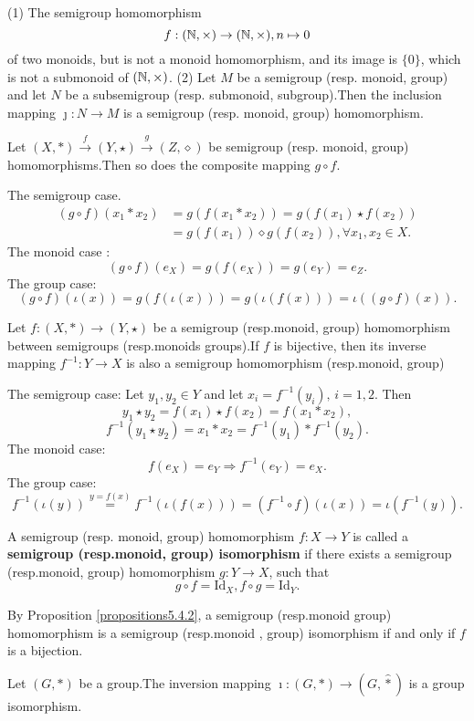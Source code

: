 \documentclass{book}
\numberwithin{equation}{section}
\begin{document}
\begin{remark}
    \quad
    \newline
    (1) The semigroup homomorphism
    $$f:(\mathbb{N}, \times)\rightarrow (\mathbb{N}, \times), n\mapsto 0$$
    of two monoids, but is not a monoid homomorphism, and its image is $\{0\}$,  which is not a submonoid of $(\mathbb{N}, \times)$.
    \newline
    (2) Let $M$ be a semigroup (resp. monoid, group) and let $N$ be a subsemigroup (resp. submonoid, subgroup).Then the inclusion mapping $\jmath :N\rightarrow M$ is a semigroup (resp. monoid,  group) homomorphism.
\end{remark}
\begin{propositionenv}\label{propositions5.4.2}
    Let $(X, *)\overset{f}{\rightarrow} (Y, \star)\overset{g}{\rightarrow}(Z, \diamond ) $ be semigroup (resp. monoid,  group) homomorphisms.Then so does the composite mapping $g\circ f$.
\end{propositionenv}
\begin{proofenv}
    The semigroup case.
        \begin{align*}
            (g\circ f)(x_1*x_2) & = g(f(x_1*x_2))  = g(f(x_1)\star f(x_2)) \\
            & = g(f(x_1))\diamond g(f(x_2)), \forall x_1, x_2\in X.
        \end{align*}
    The monoid case :
    $$(g\circ f)(e_X)=g(f(e_X))=g(e_Y)=e_Z.$$
    The group case:
    $$(g\circ f)(\iota(x))=g(f(\iota(x)))=g(\iota(f(x)))=\iota((g\circ f)(x)).$$
\end{proofenv}
\begin{propositionenv}
    Let $f:(X, *)\rightarrow (Y, \star)$ be a semigroup (resp.monoid,  group) homomorphism between semigroups (resp.monoids groups).If $f$ is bijective,  then its inverse mapping $f^{-1}:Y\rightarrow X$ is also a semigroup homomorphism (resp.monoid, group) 
\end{propositionenv}
\begin{proofenv}
    The semigroup case: Let $y_1, y_2\in Y$ and let $x_i=f^{-1}(y_i), \, i=1, 2$. Then 
    $$y_1\star y_2=f(x_1)\star f(x_2)=f(x_1*x_2), $$
    $$f^{-1}(y_1\star y_2)=x_1*x_2=f^{-1}(y_1)*f^{-1}(y_2).$$
    The monoid case:
    $$f(e_X)=e_Y\Rightarrow f^{-1}(e_Y)=e_X.$$
    The group case:
    $$f^{-1}(\iota(y))\overset{y=f(x)}{=}f^{-1}(\iota(f(x)))=(f^{-1}\circ f)(\iota(x))=\iota(f^{-1}(y)).$$
\end{proofenv}
\begin{definitionenv}
    A semigroup (resp. monoid,  group) homomorphism $f:X\rightarrow Y$ is called a \textbf{semigroup (resp.monoid, group) isomorphism} if there exists a semigroup (resp.monoid, group) homomorphism $g:Y\rightarrow X$,  such that 
    $$g\circ f=\mathrm{Id}_X, f\circ g=\mathrm{Id}_Y.$$
\end{definitionenv}
By Proposition \ref{propositions5.4.2},  a semigroup (resp.monoid group) homomorphism is a semigroup (resp.monoid , group) isomorphism if and only if $f$ is a bijection.
\begin{propositionenv}
    Let $(G, *)$ be a group.The inversion mapping $\imath :(G, *)\rightarrow(G, \hat{*})$ is a group isomorphism.
\end{propositionenv}
\end{document}
